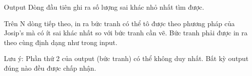 Output
Dòng đầu tiên ghi ra số lượng sai khác nhỏ nhất tìm được.  

   Trên N dòng tiếp theo, in ra bức tranh có thể tô được theo phương pháp của Josip's mà có ít sai khác nhất so với bức tranh cần vẽ. Bức tranh phải được in ra theo cùng định dạng như trong input.  

   Lưu ý: Phần thứ 2 của output (bức tranh) có thể không duy nhất. Bất kỳ output đúng nào đều được chấp nhận.